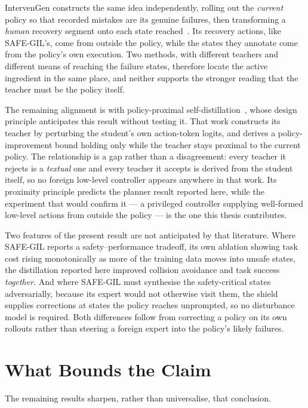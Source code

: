 \documentclass[a4paper,11pt]{report}
\begin{document}
IntervenGen constructs the same idea independently, rolling out the \emph{current} policy so that
recorded mistakes are its genuine failures, then transforming a \emph{human} recovery segment onto
each state reached~\cite{hoque2024intervengen}. Its recovery actions, like SAFE-GIL's, come from
outside the policy, while the states they annotate come from the policy's own execution. Two
methods, with different teachers and different means of reaching the failure states, therefore
locate the active ingredient in the same place, and neither supports the stronger reading that the
teacher must be the policy itself.

The remaining alignment is with policy-proximal self-distillation~\cite{wang2026roadvla}, whose
design principle anticipates this result without testing it. That work constructs its teacher by
perturbing the student's own action-token logits, and derives a policy-improvement bound holding
only while the teacher stays proximal to the current policy. The relationship is a gap rather than
a disagreement: every teacher it rejects is a \emph{textual} one and every teacher it accepts is
derived from the student itself, so no foreign low-level controller appears anywhere in that work.
Its proximity principle predicts the planner result reported here, while the experiment that would
confirm it --- a privileged controller supplying well-formed low-level actions from outside the
policy --- is the one this thesis contributes.

Two features of the present result are not anticipated by that literature. Where SAFE-GIL reports a
safety--performance tradeoff, its own ablation showing task cost rising monotonically as more of
the training data moves into unsafe states, the distillation reported here improved collision
avoidance and task success \emph{together}. And where SAFE-GIL must synthesise the safety-critical
states adversarially, because its expert would not otherwise visit them, the shield supplies
corrections at states the policy reaches unprompted, so no disturbance model is required. Both
differences follow from correcting a policy on its own rollouts rather than steering a foreign
expert into the policy's likely failures.

\section*{What Bounds the Claim}

The remaining results sharpen, rather than universalise, that conclusion.
\end{document}
